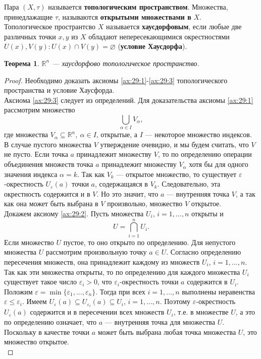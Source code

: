 \documentclass[12pt]{report}
\numberwithin{equation}{section}
\newtheorem{theorem}{Теорема}[section]
\begin{document}
Пара $(X, \tau)$ называется \textbf{топологическим пространством}. Множества, принедлажащие $\tau$, называются \textbf{открытыми множествами в} $X$.\\

Топологическое пространтсво $X$ называется \textbf{хаусдорфовым}, если любые две различных точки $x, y$ из $X$ обладают непересекающимися окрестностями $U(x),V(y): U(x) \cap V(y) = \varnothing$ (\textbf{условие Хаусдорфа}).

\begin{theorem} \label{th:29:1}
$\mathbb{R}^n$ --- хаусдорфово топологическое пространство.
\end{theorem}
\begin{proof}
Необходимо доказать аксиомы \ref{ax:29:1}-\ref{ax:29:3} топологического пространства и условие Хаусфорда.\\

Аксиома \ref{ax:29:3} следует из определений. Для доказательства аксиомы \ref{ax:29:1} рассмотрим множество
\[ \bigcup\limits_{\alpha \in I} V_{\alpha},\]
где множества $V_{\alpha} \subseteq \mathbb{R}^n,~\alpha \in I$, открытые, а $I$ --- некоторое множество индексов. В случае пустого множества $V$ утверждение очевидно, и мы будем считать, что $V$ не пусто. Если точка $a$ принадлежит множеству $V$, то по определению операции объединения множеств точка $a$ принадлежит множеству $V_{\alpha}$ хотя бы для одного значения индекса $\alpha = k$. Так как $V_k$ --- открытое множество, то существует $\varepsilon$-окрестность $U_{\varepsilon}(a)$ точки $a$, содержащаяся в $V_k$. Следовательно, эта окрестность содержится и в $V$. Но это значит, что $a$ --- внутренняя точка $V$, а так как она может быть выбрана в $V$ произвольно, множество $V$ открытое.\\

Докажем аксиому \ref{ax:29:2}. Пусть множества $U_i$, $i = 1, \ldots, n$ открыты и
\[ U = \bigcap\limits_{i = 1}^n U_i.\]
Если множество $U$ пустое, то оно открыто по определению. Для непустого множества $U$ рассмотрим произвольную точку $a \in U$. Согласно определению пересечения множеств, она принадлежит каждому из множеств $U_i$, $i = 1, \ldots, n$. Так как эти множества открыты, то по определению для каждого множества $U_i$ существует такое число $\varepsilon_i > 0$, что $\varepsilon_i$-окрестность точки $a$ содержится в $U_i$. Положим $\varepsilon = \min \{ \varepsilon_1, \ldots, \varepsilon_n \} $. Тогда при всех $i = 1, \ldots, n$ выполнены неравенства $\varepsilon \leqslant \varepsilon_i$. Имеем $U_{\varepsilon}(a) \subseteq U_{\varepsilon_i}(a) \subseteq U_i$, $i = 1, \ldots, n$. Поэтому $\varepsilon$-окрестность $U_{\varepsilon}(a)$ содержится и в пересечении всех множеств $U_i$, т.е. в множестве $U$, а это по определению означает, что $a$ --- внутренняя точка для множества $U$. Поскольку в качестве точки $a$ может быть выбрана любая точка множества $U$, это множество открытое.\\


\end{proof}
\end{document}
